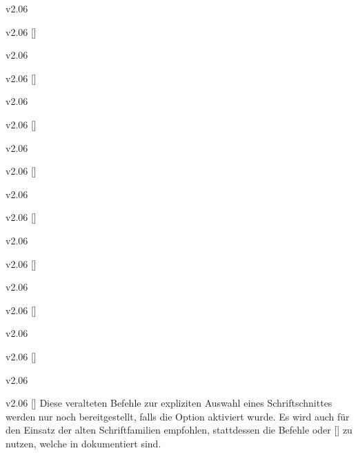 \begin{Obsolete}{v2.06}
  {}
\begin{Obsolete}{v2.06}
  {[]}
\begin{Obsolete}{v2.06}
  {}
\begin{Obsolete}{v2.06}
  {[]}
\begin{Obsolete}{v2.06}
  {}
\begin{Obsolete}{v2.06}
  {[]}
\begin{Obsolete}{v2.06}
  {}
\begin{Obsolete}{v2.06}
  {[]}
\begin{Obsolete}{v2.06}
  {}
\begin{Obsolete}{v2.06}
  {[]}
\begin{Obsolete}{v2.06}
  {}
\begin{Obsolete}{v2.06}
  {[]}
\begin{Obsolete}{v2.06}
  {}
\begin{Obsolete}{v2.06}
  {[]}
\begin{Obsolete}{v2.06}
  {}
\begin{Obsolete}{v2.06}
  {[]}
\begin{Obsolete}{v2.06}
  {}
\begin{Obsolete}{v2.06}
  {[]}
\printobsoletelist%
%
Diese veralteten Befehle zur expliziten Auswahl eines Schriftschnittes werden 
nur noch bereitgestellt, falls die Option  aktiviert wurde. 
Es wird auch für den Einsatz der alten Schriftfamilien empfohlen, stattdessen 
die Befehle  oder [] zu nutzen, 
welche in  dokumentiert sind.
\end{Obsolete}
\end{Obsolete}
\end{Obsolete}
\end{Obsolete}
\end{Obsolete}
\end{Obsolete}
\end{Obsolete}
\end{Obsolete}
\end{Obsolete}
\end{Obsolete}
\end{Obsolete}
\end{Obsolete}
\end{Obsolete}
\end{Obsolete}
\end{Obsolete}
\end{Obsolete}
\end{Obsolete}
\end{Obsolete}

